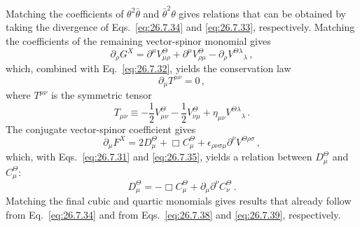 Matching the coefficients of
\(\theta^2\bar\theta\) and \(\bar\theta^2\theta\) gives relations that can be
obtained by taking the divergence of Eqs.~\eqref{eq:26.7.34} and
\eqref{eq:26.7.33}, respectively. Matching the coefficients of
the remaining vector-spinor monomial gives
\begin{equation}
  \partial_\rho G^X
  =\partial^\mu V_{\mu\rho}^\Theta
   +\partial^\mu V_{\rho\mu}^\Theta
   -\partial_\rho V^{\Theta\lambda}{}_\lambda\,,
  \tag{26.7.40}\label{eq:26.7.40}
\end{equation}
which, combined with Eq.~\eqref{eq:26.7.32}, yields the conservation law
\begin{equation}
  \partial_\mu T^{\mu\nu}=0\,,
  \tag{26.7.41}\label{eq:26.7.41}
\end{equation}
where \(T^{\mu\nu}\) is the symmetric tensor
\begin{equation}
  T_{\mu\nu}
  \equiv-\frac12V_{\mu\nu}^\Theta-\frac12V_{\nu\mu}^\Theta
         +\eta_{\mu\nu}V^{\Theta\lambda}{}_\lambda\,.
  \tag{26.7.42}\label{eq:26.7.42}
\end{equation}
The conjugate vector-spinor coefficient gives
\begin{equation}
  \partial_\mu F^X
  =2D_\mu^\Theta+\Box C_\mu^\Theta
   +\epsilon_{\rho\nu\sigma\mu}\partial^\nu
    V^{\Theta\rho\sigma}\,,
  \tag{26.7.43}\label{eq:26.7.43}
\end{equation}
which, with Eqs.~\eqref{eq:26.7.31} and \eqref{eq:26.7.35}, yields a relation
between \(D_\mu^\Theta\) and \(C_\mu^\Theta\):
\begin{equation}
  D_\mu^\Theta
  =-\Box C_\mu^\Theta+\partial_\mu\partial^\nu C_\nu^\Theta\,.
  \tag{26.7.44}\label{eq:26.7.44}
\end{equation}
Matching the final cubic and quartic monomials gives results that already follow from
Eq.~\eqref{eq:26.7.34} and from Eqs.~\eqref{eq:26.7.38} and
\eqref{eq:26.7.39}, respectively.

